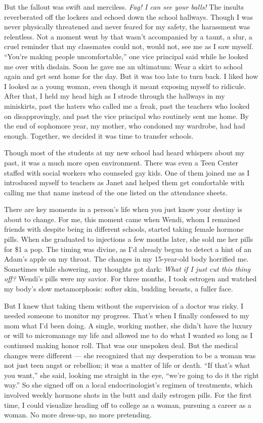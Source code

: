 \documentclass{article}
\begin{document}
But the fallout was swift and merciless. \emph{Fag! I can see your balls!} The
insults reverberated off the lockers and echoed down the school hallways.
Though I was never physically threatened and never feared for my safety, the
harassment was relentless. Not a moment went by that wasn't accompanied by a
taunt, a slur, a cruel reminder that my classmates could not, would not, see me
as I saw myself.  ``You're making people uncomfortable,'' one vice principal
said while he looked me over with disdain. Soon he gave me an ultimatum: Wear a
skirt to school again and get sent home for the day. But it was too late to
turn back. I liked how I looked as a young woman, even though it meant exposing
myself to ridicule. After that, I held my head high as I strode through the
hallways in my miniskirts, past the haters who called me a freak, past the
teachers who looked on disapprovingly, and past the vice principal who
routinely sent me home. By the end of sophomore year, my mother, who condoned
my wardrobe, had had enough. Together, we decided it was time to transfer
schools.

Though most of the students at my new school had heard whispers about my past,
it was a much more open environment. There was even a Teen Center staffed with
social workers who counseled gay kids. One of them joined me as I introduced
myself to teachers as Janet and helped them get comfortable with calling me
that name instead of the one listed on the attendance sheets.

There are key moments in a person's life when you just know your destiny is
about to change. For me, this moment came when Wendi, whom I remained friends
with despite being in different schools, started taking female hormone pills.
When she graduated to injections a few months later, she sold me her pills for
\$1 a pop. The timing was divine, as I'd already begun to detect a hint of an
Adam's apple on my throat. The changes in my 15-year-old body horrified me.
Sometimes while showering, my thoughts got dark: \emph{What if I just cut this
thing off?} Wendi's pills were my savior. For three months, I took estrogen and
watched my body's slow metamorphosis: softer skin, budding breasts, a fuller
face.

But I knew that taking them without the supervision of a doctor was risky. I
needed someone to monitor my progress. That's when I finally confessed to my
mom what I'd been doing. A single, working mother, she didn't have the luxury
or will to micromanage my life and allowed me to do what I wanted so long as I
continued making honor roll. That was our unspoken deal. But the medical
changes were different --- she recognized that my desperation to be a woman was
not just teen angst or rebellion; it was a matter of life or death. ``If that's
what you want,'' she said, looking me straight in the eye, ``we're going to do
it the right way.'' So she signed off on a local endocrinologist's regimen of
treatments, which involved weekly hormone shots in the butt and daily estrogen
pills. For the first time, I could visualize heading off to college as a woman,
pursuing a career as a woman. No more dress-up, no more pretending.
\end{document}
